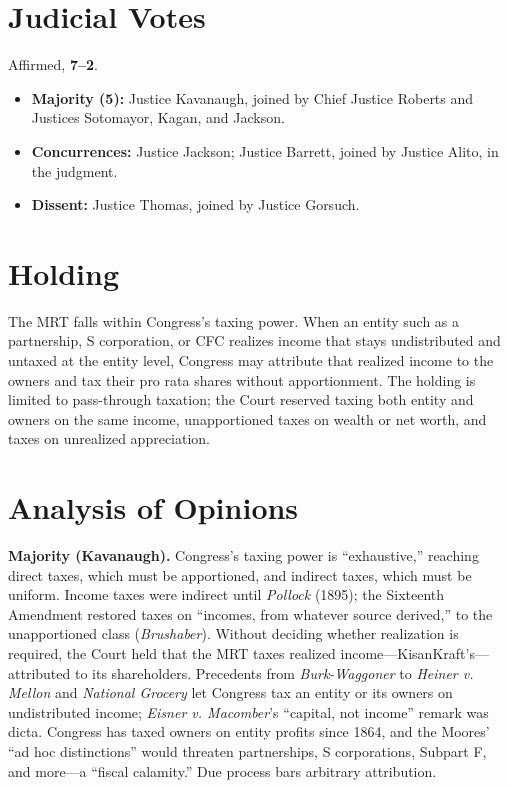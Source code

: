 \documentclass[12pt]{article}
\begin{document}
\section{Judicial Votes}

Affirmed, \textbf{7--2}.
\begin{itemize}
\item \textbf{Majority (5):} Justice Kavanaugh, joined by Chief Justice Roberts and Justices Sotomayor, Kagan, and Jackson.
\item \textbf{Concurrences:} Justice Jackson; Justice Barrett, joined by Justice Alito, in the judgment.
\item \textbf{Dissent:} Justice Thomas, joined by Justice Gorsuch.
\end{itemize}

\section{Holding}

The MRT falls within Congress's taxing power. When an entity such as a partnership, S corporation, or CFC realizes income that stays undistributed and untaxed at the entity level, Congress may attribute that realized income to the owners and tax their pro rata shares without apportionment. The holding is limited to pass-through taxation; the Court reserved taxing both entity and owners on the same income, unapportioned taxes on wealth or net worth, and taxes on unrealized appreciation.

\section{Analysis of Opinions}

\textbf{Majority (Kavanaugh).} Congress's taxing power is ``exhaustive,'' reaching direct taxes, which must be apportioned, and indirect taxes, which must be uniform. Income taxes were indirect until \textit{Pollock} (1895); the Sixteenth Amendment restored taxes on ``incomes, from whatever source derived,'' to the unapportioned class (\textit{Brushaber}). Without deciding whether realization is required, the Court held that the MRT taxes realized income---KisanKraft's---attributed to its shareholders. Precedents from \textit{Burk-Waggoner} to \textit{Heiner v. Mellon} and \textit{National Grocery} let Congress tax an entity or its owners on undistributed income; \textit{Eisner v. Macomber}'s ``capital, not income'' remark was dicta. Congress has taxed owners on entity profits since 1864, and the Moores' ``ad hoc distinctions'' would threaten partnerships, S corporations, Subpart F, and more---a ``fiscal calamity.'' Due process bars arbitrary attribution.
\end{document}
